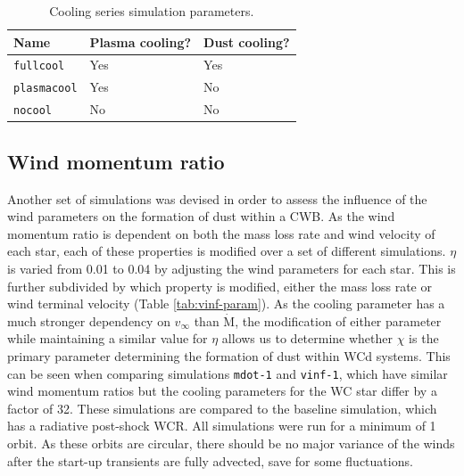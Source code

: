 \documentclass[fleqn,usenatbib]{mnras}
\begin{document}

\begin{table}
  \centering
  \begin{tabular}{lll}
    \hline
    Name & Plasma cooling? & Dust cooling? \\
    \hline
    \texttt{fullcool} & Yes & Yes \\ 
    \texttt{plasmacool} & Yes & No \\
    \texttt{nocool} & No & No \\
    \hline
  \end{tabular}
  \caption{Cooling series simulation parameters.}
  \label{tab:cooling-param}
\end{table}

\subsection{Wind momentum ratio}

Another set of simulations was devised in order to assess the influence of the wind parameters on the formation of dust within a CWB.
As the wind momentum ratio is dependent on both the mass loss rate and wind velocity of each star, each of these properties is modified over a set of different simulations.
$\eta$ is varied from 0.01 to 0.04 by adjusting the wind parameters for each star.
This is further subdivided by which property is modified, either the mass loss rate or wind terminal velocity (Table \ref{tab:vinf-param}).
As the cooling parameter has a much stronger dependency on $v_\infty$ than $\dot{\text{M}}$, the modification of either parameter while maintaining a similar value for $\eta$ allows us to determine whether $\chi$ is the primary parameter determining the formation of dust within WCd systems.
This can be seen when comparing simulations \texttt{mdot-1} and \texttt{vinf-1}, which have similar wind momentum ratios but the cooling parameters for the WC star differ by a factor of 32.
These simulations are compared to the baseline simulation, which has a radiative post-shock WCR.
All simulations were run for a minimum of 1 orbit.
As these orbits are circular, there should be no major variance of the winds after the start-up transients are fully advected, save for some fluctuations.
\end{document}
